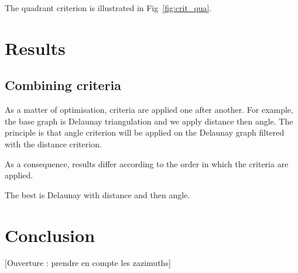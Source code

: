 \documentclass[lettersize,journal,english]{IEEEtran}
\begin{document}
The quadrant criterion is illustrated in Fig~\ref{fig:crit_qua}.

\section{Results}

\subsection{Combining criteria}
As a matter of optimisation, criteria are applied one after another. For example, the base graph is Delaunay triangulation and we apply distance then angle.
The principle is that angle criterion will be applied on the Delaunay graph filtered with the distance criterion.

As a consequence, results differ according to the order in which the criteria are applied.

The best is Delaunay with distance and then angle.

\section{Conclusion}

[Ouverture : prendre en compte les zazimuths]

\printglossary[type=\acronymtype]
\printglossary



\end{document}
